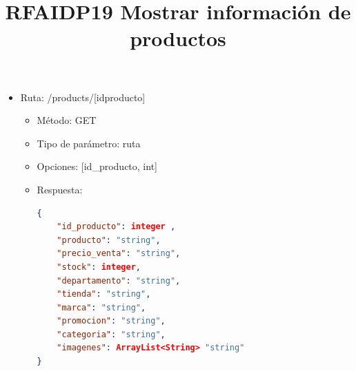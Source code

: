 \title{\textbf{RFAIDP19 Mostrar información de productos}}
\begin{itemize}
\item Ruta: /products/[idproducto]
\begin{itemize}
\item Método: GET
\item Tipo de parámetro: ruta
\item Opciones: [id\_producto, int]
\item Respuesta: 
\begin{lstlisting}[language=json,firstnumber=1]
{
	"id_producto": integer ,
	"producto": "string",
	"precio_venta": "string",
	"stock": integer,
	"departamento": "string",
	"tienda": "string",
	"marca": "string", 
	"promocion": "string",
	"categoria": "string",
	"imagenes": ArrayList<String> "string"
}
\end{lstlisting}
\end{itemize}
\end{itemize}

